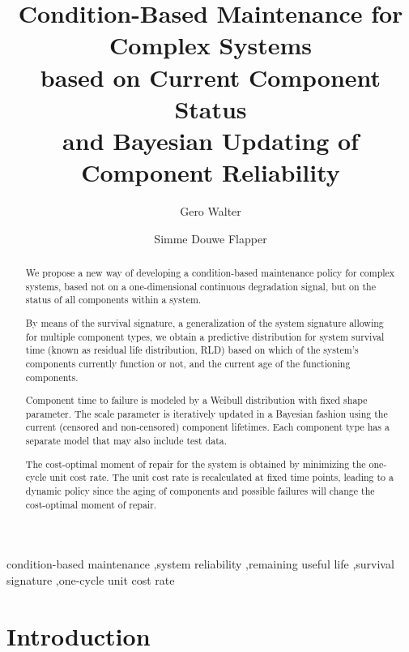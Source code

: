\documentclass[authoryear]{elsarticle}
\begin{document}

\begin{frontmatter}
\title{Condition-Based Maintenance for Complex Systems\\ based on Current Component Status\\ and Bayesian Updating of Component Reliability}

\author[tue]{Gero Walter}
\author[tue]{Simme Douwe Flapper}

\address[tue]{School of Industrial Engineering, Eindhoven University of Technology, Eindhoven, Netherlands}


\begin{abstract}
We propose a new way of developing a condition-based maintenance policy for complex systems,
based not on a one-dimensional continuous degradation signal,
but on the status of all components within a system.

By means of the survival signature,
a generalization of the system signature allowing for multiple component types,
we obtain a predictive distribution for system survival time
(known as residual life distribution, RLD)
based on which of the system's components currently function or not,
and the current age of the functioning components.

Component time to failure is modeled by a Weibull distribution with fixed shape parameter.
The scale parameter is iteratively updated in a Bayesian fashion
using the current (censored and non-censored) component lifetimes.
Each component type has a separate model that may also include test data.

The cost-optimal moment of repair for the system is obtained by minimizing the one-cycle unit cost rate.
The unit cost rate is recalculated at fixed time points,
leading to a dynamic policy since the aging of components and possible failures will change the cost-optimal moment of repair.
\end{abstract}

\begin{keyword}
condition-based maintenance \sep system reliability \sep remaining useful life \sep survival signature \sep one-cycle unit cost rate\end{keyword}
\end{frontmatter}



\section{Introduction}
\label{intro}
\end{document}
